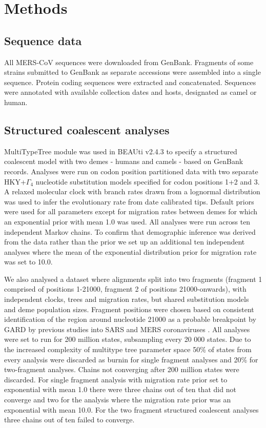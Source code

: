 \documentclass[11pt,oneside,letterpaper]{article}
\begin{document}
\newpage

\section*{Methods}
\subsection*{Sequence data}
All MERS-CoV sequences were downloaded from GenBank.
Fragments of some strains submitted to GenBank as separate accessions were assembled into a single sequence.
Protein coding sequences were extracted and concatenated.
Sequences were annotated with available collection dates and hosts, designated as camel or human.

\subsection*{Structured coalescent analyses}
MultiTypeTree module \citep{vaughan_efficient_2014} was used in BEAUti v2.4.3 \citep{bouckaert_beast_2014} to specify a structured coalescent model with two demes - humans and camels - based on GenBank records.
Analyses were run on codon position partitioned data with two separate HKY+$\Gamma_{4}$ \citep{hky_1985,yang_1994} nucleotide substitution models specified for codon positions 1+2 and 3.
A relaxed molecular clock with branch rates drawn from a lognormal distribution \citep{drummond_2006} was used to infer the evolutionary rate from date calibrated tips.
Default priors were used for all parameters except for migration rates between demes for which an exponential prior with mean 1.0 was used.
All analyses were run across ten independent Markov chains.
To confirm that demographic inference was derived from the data rather than the prior we set up an additional ten independent analyses where the mean of the exponential distribution prior for migration rate was set to 10.0.

We also analysed a dataset where alignments split into two fragments (fragment 1 comprised of positions 1-21000, fragment 2 of positions 21000-onwards), with independent clocks, trees and migration rates, but shared substitution models and deme population sizes.
Fragment positions were chosen based on consistent identification of the region around nucleotide 21000 as a probable breakpoint by GARD \citep{pond_gard:_2006} by previous studies into SARS and MERS coronaviruses \citep{hon_evidence_2008,dudas_mers-cov_2016}.
All analyses were set to run for 200 million states, subsampling every 20 000 states.
Due to the increased complexity of multitype tree parameter space 50\% of states from every analysis were discarded as burnin for single fragment analyses and 20\% for two-fragment analyses.
Chains not converging after 200 million states were discarded.
For single fragment analysis with migration rate prior set to exponential with mean 1.0 there were three chains out of ten that did not converge and two for the analysis where the migration rate prior was an exponential with mean 10.0.
For the two fragment structured coalescent analyses three chains out of ten failed to converge.
\end{document}
